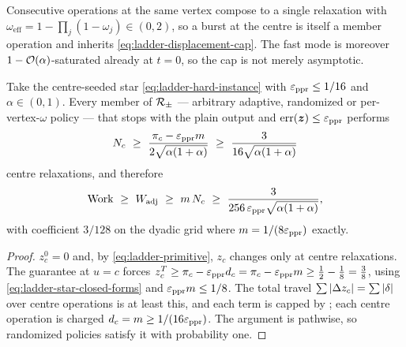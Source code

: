 \begin{remark}
\label{rem:ladder-bursts}
Consecutive operations at the same vertex compose to a single relaxation with
$\omega_{\mathrm{eff}}=1-\prod_{j}(1-\omega_{j})\in(0,2)$, so a burst at the
centre is itself a member operation and inherits
\eqref{eq:ladder-displacement-cap}. The fast mode is moreover
$1-\mathcal{O}(\alpha)$-saturated already at $t=0$, so the cap is not merely
asymptotic.
\end{remark}

\begin{theorem}
\label{thm:ladder-signed-lower-bound}
Take the centre-seeded star \eqref{eq:ladder-hard-instance} with
$\varepsilon_{\mathrm{ppr}}\le1/16$ and $\alpha\in(0,1)$. Every member of $\mathcal{R}_{\pm}$ --- arbitrary
adaptive, randomized or per-vertex-$\omega$ policy --- that stops with the
plain output and $\operatorname{err}(\bm{z})\le\varepsilon_{\mathrm{ppr}}$ performs
\begin{equation}
    N_{c}\ \ge\ \frac{\pi_{c}-\varepsilon_{\mathrm{ppr}} m}{2\sqrt{\alpha(1+\alpha)}}
    \ \ge\ \frac{3}{16\sqrt{\alpha(1+\alpha)}}
    \label{eq:ladder-signed-count}
\end{equation}
centre relaxations, and therefore
\begin{equation}
    \Work\ \ge\ W_{\mathrm{adj}}\ \ge\ m\,N_{c}
    \ \ge\ \frac{3}{256\,\epsppr\sqrt{\alpha(1+\alpha)}},
    \label{eq:ladder-signed-work}
\end{equation}
with coefficient $3/128$ on the dyadic grid where $m=1/(8\varepsilon_{\mathrm{ppr}})$ exactly.
\end{theorem}

\begin{proof}
$z_{c}^{0}=0$ and, by \eqref{eq:ladder-primitive}, $z_{c}$ changes only at
centre relaxations. The guarantee at $u=c$ forces
$z_{c}^{T}\ge\pi_{c}-\varepsilon_{\mathrm{ppr}} d_{c}=\pi_{c}-\varepsilon_{\mathrm{ppr}} m\ge\tfrac12-\tfrac18
=\tfrac38$, using \eqref{eq:ladder-star-closed-forms} and $\varepsilon_{\mathrm{ppr}} m\le1/8$.
The total travel $\sum\left\lvert \Delta z_{c} \right\rvert=\sum\left\lvert \delta \right\rvert$ over centre
operations is at least this, and each term is capped by
; each centre operation is charged
$d_{c}=m\ge1/(16\varepsilon_{\mathrm{ppr}})$. The argument is pathwise, so randomized policies
satisfy it with probability one.
\end{proof}

